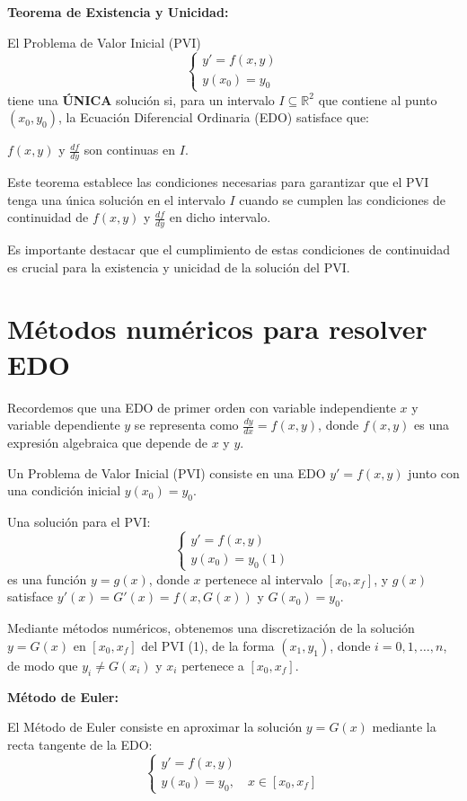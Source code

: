 \documentclass[12pt,letterpaper]{article}
\begin{document}
\textbf{Teorema de Existencia y Unicidad:}

El Problema de Valor Inicial (PVI) 
\[
\begin{cases}
y' = f(x, y)\\
y(x_0) = y_0
\end{cases}
\]
tiene una \textbf{ÚNICA} solución si, para un intervalo \(I \subseteq \mathbb{R}^2\) que contiene al punto \((x_0, y_0)\), la Ecuación Diferencial Ordinaria (EDO) satisface que:

\(f(x, y)\) y \(\frac{df}{dy}\) son continuas en \(I\).

Este teorema establece las condiciones necesarias para garantizar que el PVI tenga una única solución en el intervalo \(I\) cuando se cumplen las condiciones de continuidad de \(f(x, y)\) y \(\frac{df}{dy}\) en dicho intervalo.

Es importante destacar que el cumplimiento de estas condiciones de continuidad es crucial para la existencia y unicidad de la solución del PVI.


\cite[pp. 43]{librozill}

\section{Métodos numéricos para resolver EDO}

Recordemos que una EDO de primer orden con variable independiente \(x\) y variable dependiente \(y\) se representa como \(\frac{dy}{dx} = f(x,y)\), donde \(f(x, y)\) es una expresión algebraica que depende de \(x\) y \(y\).

Un Problema de Valor Inicial (PVI) consiste en una EDO \(y' = f(x,y)\) junto con una condición inicial \(y(x_0) = y_0\).

Una solución para el PVI:
\[
\begin{cases}
y' = f(x,y) \\
y(x_0) = y_0                (1)
\end{cases}
\]
es una función \(y = g(x)\), donde \(x\) pertenece al intervalo \([x_0, x_f]\), y \(g(x)\) satisface \(y'(x) = G'(x) = f(x, G(x))\) y \(G(x_0) = y_0\).

Mediante métodos numéricos, obtenemos una discretización de la solución \(y = G(x)\) en \([x_0, x_f]\) del PVI (1), de la forma \((x_1, y_1)\), donde \(i = 0, 1, \ldots, n\), de modo que \(y_i \neq G(x_i)\) y \(x_i\) pertenece a \([x_0, x_f]\).

\textbf{Método de Euler:}

El Método de Euler consiste en aproximar la solución \(y = G(x)\) mediante la recta tangente de la EDO:
\[
\begin{cases}
y' = f(x,y) \\
y(x_0) = y_0, \quad x \in [x_0, x_f]
\end{cases}
\]
\end{document}
